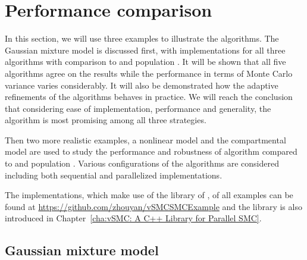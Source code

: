 \section{Performance comparison}
\label{sec:Performance comparison}

In this section, we will use three examples to illustrate the algorithms. The
Gaussian mixture model is discussed first, with implementations for all three
\smc algorithms with comparison to \rjmcmc and population \mcmc. It will be
shown that all five algorithms agree on the results while the performance in
terms of Monte Carlo variance varies considerably. It will also be
demonstrated how the adaptive refinements of the algorithms behaves in
practice. We will reach the conclusion that considering ease of
implementation, performance and generality, the \smc[2] algorithm is most
promising among all three strategies.

Then two more realistic examples, a nonlinear \ode model and the \pet
compartmental model are used to study the performance and robustness of
algorithm \smc[2] compared to \ais and population \mcmc. Various
configurations of the algorithms are considered including both sequential and
parallelized implementations.

The \cpp implementations, which make use of the \vsmc library of
\cite{vsmcjss}, of all examples can be found at
\url{https://github.com/zhouyan/vSMCSMCExample} and the library is also
introduced in Chapter~\ref{cha:vSMC: A C++ Library for Parallel SMC}.

\subsection{Gaussian mixture model}
\label{sub:Gaussian mixture model}

